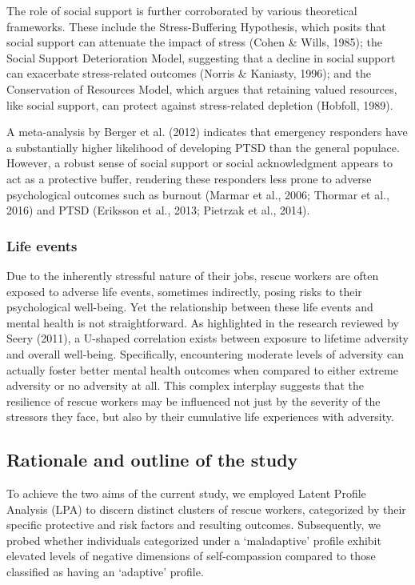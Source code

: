 \documentclass[
  man]{apa7}
\begin{document}
The role of social support is further corroborated by various theoretical frameworks. These include the Stress-Buffering Hypothesis, which posits that social support can attenuate the impact of stress (Cohen \& Wills, 1985); the Social Support Deterioration Model, suggesting that a decline in social support can exacerbate stress-related outcomes (Norris \& Kaniasty, 1996); and the Conservation of Resources Model, which argues that retaining valued resources, like social support, can protect against stress-related depletion (Hobfoll, 1989).

A meta-analysis by Berger et al. (2012) indicates that emergency responders have a substantially higher likelihood of developing PTSD than the general populace. However, a robust sense of social support or social acknowledgment appears to act as a protective buffer, rendering these responders less prone to adverse psychological outcomes such as burnout (Marmar et al., 2006; Thormar et al., 2016) and PTSD (Eriksson et al., 2013; Pietrzak et al., 2014).

\hypertarget{life-events}{%
\subsubsection{Life events}\label{life-events}}

Due to the inherently stressful nature of their jobs, rescue workers are often exposed to adverse life events, sometimes indirectly, posing risks to their psychological well-being. Yet the relationship between these life events and mental health is not straightforward. As highlighted in the research reviewed by Seery (2011), a U-shaped correlation exists between exposure to lifetime adversity and overall well-being. Specifically, encountering moderate levels of adversity can actually foster better mental health outcomes when compared to either extreme adversity or no adversity at all. This complex interplay suggests that the resilience of rescue workers may be influenced not just by the severity of the stressors they face, but also by their cumulative life experiences with adversity.

\hypertarget{rationale-and-outline-of-the-study}{%
\subsection{Rationale and outline of the study}\label{rationale-and-outline-of-the-study}}

To achieve the two aims of the current study, we employed Latent Profile Analysis (LPA) to discern distinct clusters of rescue workers, categorized by their specific protective and risk factors and resulting outcomes. Subsequently, we probed whether individuals categorized under a `maladaptive' profile exhibit elevated levels of negative dimensions of self-compassion compared to those classified as having an `adaptive' profile.
\end{document}
